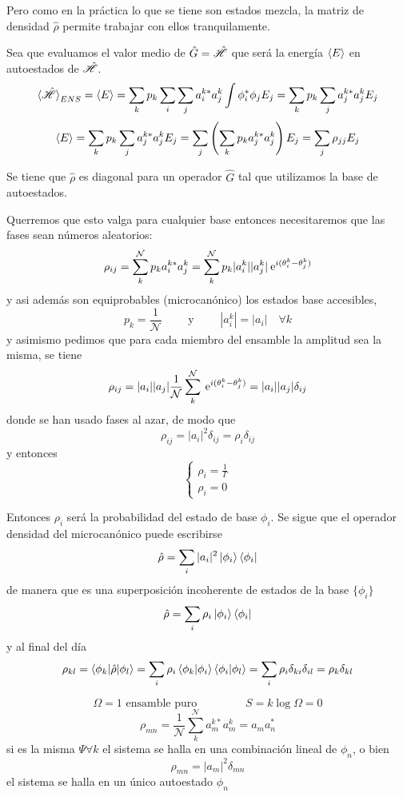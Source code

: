 \documentclass[10pt,oneside]{CBFT_book}
\begin{document}
Pero como en la práctica lo que se tiene son estados mezcla, la matriz de densidad $\hat{\rho}$ permite trabajar
con ellos tranquilamente.

Sea que evaluamos el valor medio de $ \hat{G} = \hat{\mathscr{H}} $ que será la energía $\braket{E}$ en autoestados de 
$ \hat{\mathscr{H}} $.
\[
	\braket{\hat{\mathscr{H}}}_{ENS} = \braket{E} = \sum_k p_k \sum_i \sum_j a_i^{k*} a_j^k \int \phi_i^* \phi_j E_j =
	\sum_k p_k \sum_j a_j^{k*} a_j^k E_j
\]
\[
	\braket{E} = \sum_k p_k \sum_j a_j^{k*} a_j^k E_j = \sum_j \left( \sum_k p_k a_j^{k*} a_j^k \right) E_j =
	\sum_j \rho_{jj} E_j
\]

Se tiene que $ \hat{\rho} $ es diagonal para un operador $\hat{G}$ tal que utilizamos la base de autoestados.

Querremos que esto valga para cualquier base entonces necesitaremos que las fases sean números aleatorios:
\[
	\rho_{ij} = \sum_k^{\mathcal{N}} p_k a_i^{k*} a_j^k = 
	\sum_k^{\mathcal{N}} p_k | a_i^k | | a_j^k |\:\mathrm{e}^{i( \theta_i^k - \theta_j^k )}
\]
y asi además son equiprobables (microcanónico) los estados base accesibles,
\[
	p_k = \frac{1}{\mathcal{N}} \qquad \text{ y } \qquad |a^k_i| = |a_i| \quad \forall k
\]
y asimismo pedimos que para cada miembro del ensamble la amplitud sea la misma, se tiene 
\[
	\rho_{ij} = | a_i | | a_j | \frac{1}{\mathcal{N}} \sum_k^{\mathcal{N}} \:\mathrm{e}^{i( \theta_i^k - \theta_j^k )}
	= | a_i | | a_j | \delta_{ij}
\]
donde se han usado fases al azar, de modo que 
\[
	\rho_{ij} = | a_i |^2 \delta_{ij} = \rho_i \delta_{ij}
\]
y entonces 
\[
	\begin{cases}
	 \rho_i = \displaystyle{ \frac{1}{\Gamma} }\\
	 \rho_i = 0
	\end{cases}
\]

Entonces $ \rho_i $ será la probabilidad del estado de base $ \phi_i $. Se sigue que el operador densidad del
microcanónico puede escribirse 
\[
	\hat{\rho} = \sum_i | a_i |^2 \Ket{\phi_i}\Bra{\phi_i}
\]
de manera que es una superposición incoherente de estados de la base $\{ \phi_i \}$
\[
	\hat{\rho} = \sum_i \rho_i \Ket{\phi_i}\Bra{\phi_i}
\]
y al final del día
\[
	\rho_{kl} = \braket{ \phi_k | \hat{\rho} | \phi_l } = \sum_i \rho_i 
	\braket{ \phi_k | \phi_i }  \braket{ \phi_i | \phi_l } = \sum_i \rho_i \delta_{ki} \delta_{il} = 
	\rho_k \delta_{kl}
\]

\[
	\Omega = 1 \text{ ensamble puro } \qquad \qquad S = k\log \Omega = 0
\]
\[
	\rho_{mn} = \frac{1}{\mathcal{N}} \sum_k^{\mathcal{N}} a_m^{k*} a_m^k = a_m a_n^* 
\]
si es la misma $\Psi \forall k$ el sistema se halla en una combinación lineal de $\phi_n$, o bien
\[
	\rho_{mn} = |a_m|^2 \delta_{mn}
\]
el sistema se halla en un único autoestado $ \phi_n $
\end{document}
